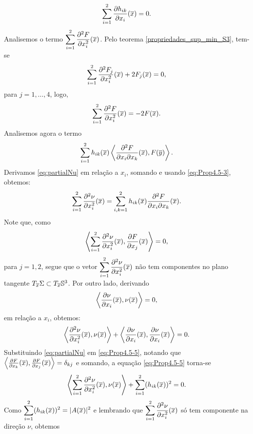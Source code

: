 \begin{demonstracao}
\begin{eqnarray}\label{eq:Prop4.5-3}
\sum_{i=1}^2\frac{\partial h_{ik}}{\partial x_i}(\overline{x}) = 0.
\end{eqnarray}
Analisemos o termo 
$\displaystyle\sum_{i=1}^2 \frac{\partial^2 F}{\partial x_i^2}(\overline{x})$. 
Pelo teorema \ref{propriedades_sup_min_S3}, tem-se
\begin{equation*}
\sum_{i=1}^2 \frac{\partial^2 F_j}{\partial x_i^2}(\overline{x}) + 2F_j(\overline{x}) = 0,
\end{equation*}
para $j=1,\ldots,4$, logo,
\[
\sum_{i=1}^2 \frac{\partial^2 F}{\partial x_i^2}(\overline{x}) = -2 F(\overline{x}).
\]
Analisemos agora o termo 
\[
\sum_{i=1}^2 h_{ik}(\overline{x}) \left\langle \frac{\partial^2 F}
{\partial x_i \partial x_k}(\overline{x}), F(\overline{y}) \right\rangle.
\]
Derivamos \eqref{eq:partialNu} em rela\c c\~ao a $x_i$, somando
e usando \eqref{eq:Prop4.5-3}, obtemos:
\begin{eqnarray}\label{eq:Prop4.5-4}
\sum_{i=1}^2 \frac{\partial^2 \nu}{\partial x_i^2}(\overline{x}) = 
\sum_{i,k=1}^2 h_{ik}(\overline{x})\frac{\partial^2 F}{\partial x_i \partial x_k}(\overline{x}).
\end{eqnarray}
Note que, como
\[
\left\langle \sum_{i=1}^2 \frac{\partial^2 \nu}{\partial x_i^2}(\overline{x}), 
\frac{\partial F}{\partial x_j}(\overline{x}) \right\rangle = 0,
\]
para $j=1,2$, segue que o vetor
$\displaystyle\sum_{i=1}^2 \frac{\partial^2 \nu}{\partial x_i^2}(\overline{x})$ 
não tem componentes no plano tangente 
$T_{\overline{x}}\Sigma\subset T_{\overline{x}}\mathbb{S}^3$. 
Por outro lado, derivando
\[
\left\langle \frac{\partial \nu}{\partial x_i}(\overline{x}), \nu(\overline{x}) \right\rangle = 0,
\]
em rela\c c\~ao a $x_i$, obtemos:
\begin{equation}\label{eq:Prop4.5-5}
\left\langle \frac{\partial^2 \nu}{\partial x_i^2}(\overline{x}), \nu(\overline{x})\right\rangle 
+ \left\langle \frac{\partial \nu}{\partial x_i}(\overline{x}), 
\frac{\partial \nu}{\partial x_i}(\overline{x}) \right\rangle = 0.
\end{equation}	
Substituindo \eqref{eq:partialNu} em \eqref{eq:Prop4.5-5}, notando que
$\left\langle \frac{\partial F}{\partial x_k}(\overline{x}), 
\frac{\partial F}{\partial x_j}(\overline{x}) \right\rangle = \delta_{kj}$ e somando,
a equa\c c\~ao \eqref{eq:Prop4.5-5} torna-se
\begin{equation*}
\left\langle \sum_{i=1}^2 \frac{\partial^2 \nu}{\partial x_i^2}(\overline{x}), \nu(\overline{x})
\right\rangle + \sum_{i=1}^2 (h_{ik}(\overline{x}))^2 = 0.
\end{equation*}	
Como $\displaystyle\sum_{i=1}^2 (h_{ik}(\overline{x}))^2 = |A(\overline{x})|^2$ e
lembrando que 
$\displaystyle\sum_{i=1}^2 \frac{\partial^2 \nu}{\partial x_i^2}(\overline{x})$ 
só tem componente na direção $\nu$, obtemos

\end{demonstracao}
